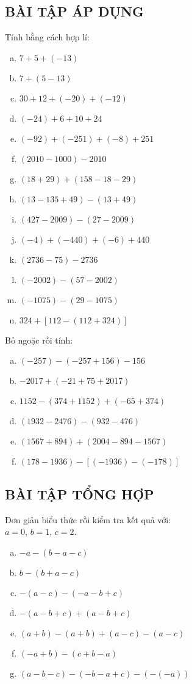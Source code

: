 \subsection{BÀI TẬP ÁP DỤNG}
\begin{bt}
Tính bằng cách hợp lí:
\begin{multicols}{2}
\begin{enumerate}[a)]
\item $7+5 + (-13)$
\item $7+ (5-13)$
\item $30+12+(-20)+(-12)$
\item $(-24)+6 + 10 + 24$
\item $(-92)+ (-251) + (-8) + 251$
\item $(2010-1000) - 2010$
\item $(18+29) + (158-18-29)$
\item $(13-135+49)-(13+49)$
\item $(427-2009)-(27-2009)$
\item $(-4)+(-440)+(-6)+440$
\item $(2736-75)-2736$
\item $(-2002) - (57-2002)$
\item $(-1075) - (29-1075)$
\item $324 + [ 112 - (112+324)]$
\end{enumerate}
\end{multicols}
\end{bt}   \begin{bt}
Bỏ ngoặc rồi tính:
\begin{enumerate}[a)]
\item $(-257) - (-257+156) -156$
\item $-2017 + (-21+75+ 2017)$
\item $1152 - (374 + 1152) +(-65+374)$
\item $(1932-2476) - (932 -476)$
\item $(1567 + 894) + (2004 - 894 - 1567)$
\item $(178-1936) - [(-1936) - (-178)]$
\end{enumerate}

\subsection{BÀI TẬP TỔNG HỢP}

\end{bt}   \begin{bt}
Đơn giản biểu thức rồi kiểm tra kết quả với: \\$a=0$, $b=1$, $c=2$.
\begin{enumerate}[a)]
\item $-a - (b-a-c)$
\item $b- (b+a-c)$
\item $-(a-c) - (-a-b+c)$
\item $-(a-b+c) + (a-b+c)$
\item $(a+b) - (a+b) +(a-c) - (a-c)$
\item $(-a+b) - (c+b-a)$
\item $(a-b-c) - (-b-a+c)- (-(-a))$
\end{enumerate}
\end{bt}

